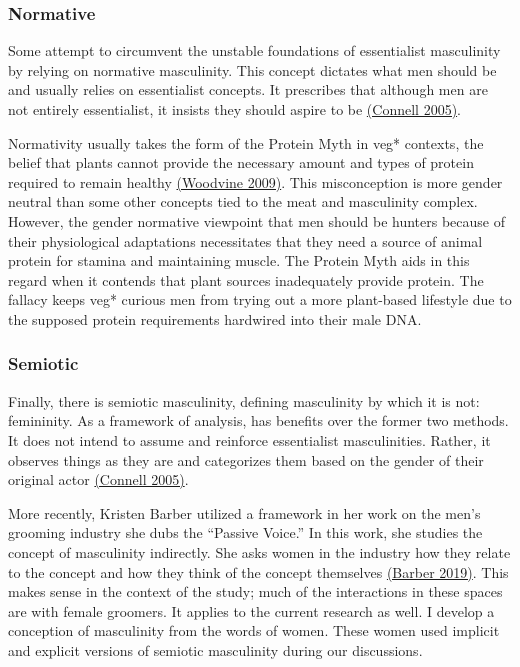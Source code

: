 \documentclass[twoside]{report}
\begin{document}
\subsubsection{Normative}

Some attempt to circumvent the unstable foundations of essentialist masculinity by relying on normative masculinity. This concept dictates what men should be and usually relies on essentialist concepts. It prescribes that although men are not entirely essentialist, it insists they should aspire to be \hyperlink{connell}{(Connell 2005)}.

Normativity usually takes the form of the Protein Myth in veg* contexts, the belief that plants cannot provide the necessary amount and types of protein required to remain healthy \hyperlink{woodvine}{(Woodvine 2009)}. This misconception is more gender neutral than some other concepts tied to the meat and masculinity complex. However, the gender normative viewpoint that men should be hunters because of their physiological adaptations necessitates that they need a source of animal protein for stamina and maintaining muscle. The Protein Myth aids in this regard when it contends that plant sources inadequately provide protein. The fallacy keeps veg* curious men from trying out a more plant-based lifestyle due to the supposed protein requirements hardwired into their male DNA.

\subsubsection{Semiotic}

Finally, there is semiotic masculinity, defining masculinity by which it is not: femininity. As a framework of analysis, has benefits over the former two methods. It does not intend to assume and reinforce essentialist masculinities. Rather, it observes things as they are and categorizes them based on the gender of their original actor \hyperlink{connell}{(Connell 2005)}.

More recently, Kristen Barber utilized a framework in her work on the men's grooming industry she dubs the ``Passive Voice.'' In this work, she studies the concept of masculinity indirectly. She asks women in the industry how they relate to the concept and how they think of the concept themselves \hyperlink{barber2}{(Barber 2019)}. This makes sense in the context of the study; much of the interactions in these spaces are with female groomers. It applies to the current research as well. I develop a conception of masculinity from the words of women. These women used implicit and explicit versions of semiotic masculinity during our discussions.
\end{document}
